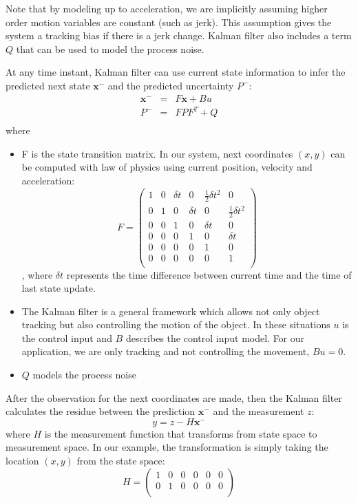 Note that by modeling up to acceleration, we are implicitly assuming higher order motion variables are constant (such as jerk). This assumption gives the system a tracking bias if there is a jerk change. Kalman filter also includes a term $Q$ that can be used to model the process noise. 

At any time instant, Kalman filter can use current state information to infer the predicted next state $\mathbf{x}^-$ and the predicted uncertainty $P^-$:
\begin{eqnarray}
\mathbf{x}^- & = &F \mathbf{x} + Bu\\
P^- & = & FPF^T + Q\\
\end{eqnarray}
where
\begin{itemize}
\item F is the state transition matrix. In our system, next coordinates $(x,y)$ can be computed with law of physics using current position, velocity and acceleration:
\[
F  =  \left(\begin{array}{cccccc}
1 & 0 & \delta t & 0 & \frac{1}{2}\delta t^2 & 0 \\
0 & 1 & 0 & \delta t & 0 & \frac{1}{2} \delta t^2 \\
0 & 0 & 1 & 0 & \delta t & 0\\
0 & 0 & 0 & 1 & 0 & \delta t\\
0 & 0 & 0 & 0 & 1 & 0 \\
0 & 0 & 0 & 0 & 0 & 1 \\
\end{array}\right)
\], where $\delta t$ represents the time difference between current time and the time of last state update. 
\item The Kalman filter is a general framework which allows not only object tracking but also controlling the motion of the object. In these situations $u$ is the control input and $B$ describes the control input model. For our application, we are only tracking and not controlling the movement, $Bu = 0$.
\item $Q$ models the process noise
\end{itemize}

After the observation for the next coordinates are made, then the Kalman filter calculates the residue between the prediction $\mathbf{x}^-$ and the measurement $z$:
\[
y = z - H\mathbf{x}^-
\]
where $H$ is the measurement function that transforms from state space to measurement space. In our example, the transformation is simply taking the location $(x,y)$ from the state space:
\[
H = \left(\begin{array}{cccccc}
1 & 0 & 0 & 0 & 0 & 0 \\
0 & 1 & 0 & 0 & 0 & 0 \\
\end{array}\right)
\]

